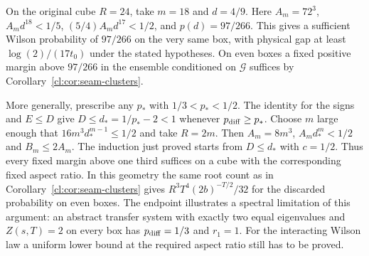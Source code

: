 On the original cube $R=24$, take $m=18$ and $d=4/9$. Here
$A_m=72^3$, $A_md^{18}<1/5$, $(5/4)A_md^{17}<1/2$, and $p(d)=97/266$.
This gives a sufficient Wilson probability of $97/266$ on the very
same box, with physical gap at least $\log(2)/(17t_0)$ under the
stated hypotheses. On even boxes a fixed positive margin above
$97/266$ in the ensemble conditioned on $\mathcal G$ suffices by
Corollary~\ref{cl:cor:seam-clusters}.

More generally, prescribe any $p_*$ with $1/3<p_*<1/2$. The identity
for the signs and $E\le D$ give $D\le d_*=1/p_*-2<1$ whenever
$p_{\rm diff}\ge p_*$. Choose $m$ large enough that
$16m^3d_*^{m-1}\le1/2$ and take $R=2m$. Then $A_m=8m^3$,
$A_md_*^m<1/2$ and $B_m\le2A_m$. The
induction just proved starts from $D\le d_*$ with $c=1/2$. Thus every
fixed margin above one third suffices on a cube with the corresponding
fixed aspect ratio. In this geometry the same root count as in
Corollary~\ref{cl:cor:seam-clusters} gives
$R^3T^4(2b)^{-T/2}/32$ for the discarded probability on even boxes.
The endpoint illustrates a spectral limitation of this argument: an
abstract transfer system with exactly two equal eigenvalues and
$Z(s,T)=2$ on every box has $p_{\rm diff}=1/3$ and $r_1=1$.
For the interacting Wilson law a uniform lower bound at the required
aspect ratio still has to be proved.

